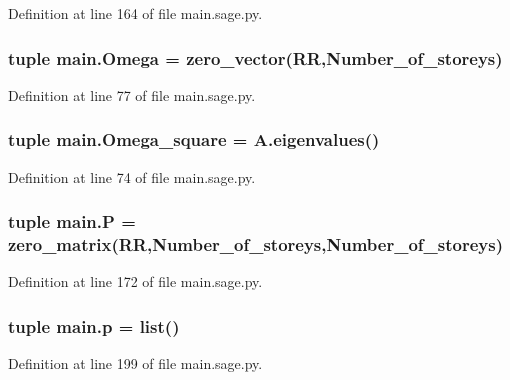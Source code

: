 Definition at line 164 of file main.\+sage.\+py.

\hypertarget{namespacemain_a0cc58897a39912c706ab64fd26e0d62e}{}
\subsubsection[{Omega}]{\setlength{\rightskip}{0pt plus 5cm}tuple main.\+Omega = zero\+\_\+vector(R\+R,Number\+\_\+of\+\_\+storeys)}\label{namespacemain_a0cc58897a39912c706ab64fd26e0d62e}


Definition at line 77 of file main.\+sage.\+py.

\hypertarget{namespacemain_abc7a524ddae98db1c2f4cf8535104feb}{}
\subsubsection[{Omega\+\_\+square}]{\setlength{\rightskip}{0pt plus 5cm}tuple main.\+Omega\+\_\+square = A.\+eigenvalues()}\label{namespacemain_abc7a524ddae98db1c2f4cf8535104feb}


Definition at line 74 of file main.\+sage.\+py.

\hypertarget{namespacemain_ad403610ba53df02f8dfaff8dd64227b3}{}
\subsubsection[{P}]{\setlength{\rightskip}{0pt plus 5cm}tuple main.\+P = zero\+\_\+matrix(R\+R,Number\+\_\+of\+\_\+storeys,Number\+\_\+of\+\_\+storeys)}\label{namespacemain_ad403610ba53df02f8dfaff8dd64227b3}


Definition at line 172 of file main.\+sage.\+py.

\hypertarget{namespacemain_ab31fc16b432d2248a6c76c6a18d741d0}{}
\subsubsection[{p}]{\setlength{\rightskip}{0pt plus 5cm}tuple main.\+p = list()}\label{namespacemain_ab31fc16b432d2248a6c76c6a18d741d0}


Definition at line 199 of file main.\+sage.\+py.

\hypertarget{namespacemain_add7e0394c94a2e2115aff785eb6995e3}{}
